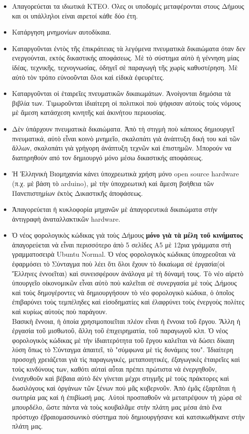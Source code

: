 \documentclass[a4paper]{article}
\begin{document}
\begin{itemize}
\item Aπαγορεύεται τα ιδιωτικά ΚΤΕΟ. Όλες οι υποδομές μεταφέρονται στους Δήμους και οι υπάλληλοι είναι αιρετοί κάθε δύο έτη.
\item Κατάργηση μνημονίων αυτοδίκαια.
\item Καταργοῦνται ἐντὸς τῆς ἐπικράτειας τὰ λεγόμενα πνευματικὰ δικαιώματα όταν δεν ενεργούνται, εκτός δικαστικής αποφάσεως. Μὲ τὸ σύστημα αὐτὸ ἡ γέννηση μίας ἰδέας, τεχνικῆς, τεχνογνωσίας, ὁδηγεῖ σὲ παραγωγὴ τῆς χωρὶς καθυστέρηση. Μὲ αὐτὸ τὸν τρόπο εὐνοοῦνται ὅλοι καὶ εἰδικὰ ἐφευρέτες.
\item Καταργοῦνται οἱ ἑταιρεῖες πνευματικῶν δικαιωμάτων. Ἀνοίγονται δημόσια τὰ βιβλία των. Τιμωροῦνται ἰδιαίτερη οἱ πολιτικοὶ ποὺ ψήφισαν αὐτοὺς τοὺς νόμους μὲ ἄμεση κατάσχεση κινητῆς καὶ ἀκινήτου περιουσίας.
\item Δὲν ὑπάρχουν πνευματικὰ δικαιώματα. Ἀπὸ τὴ στιγμὴ ποὺ κάποιος δημιουργεῖ πνευματικά, αὐτὸ εἶναι κοινὸ μνημεῖο, σκαλοπάτι γιὰ ἀνάπτυξη δική του καὶ τῶν ἄλλων, σκαλοπάτι γιὰ γρήγορη ἀνάπτυξη τεχνῶν καὶ ἐπιστημῶν. Μπορούν να διατηρηθούν από τον δημιουργό μόνο μέσω δικαστικής αποφάσεως.
\item  Ἡ Ἑλληνικὴ Βιομηχανία κάνει ὑποχρεωτικὰ χρήση μόνο open source hardware (π.χ. μὲ βάση τὸ arduino), μὲ τὴν ὑποχρεωτικὴ καὶ ἄμεση βοήθεια τῶν Πανεπιστημίων ἐκτὸς Δικαστικῆς ἀποφάσεως.
\item Ἀπαγορεύεται ἡ κυκλοφορία μηχανῶν μὲ ἀπαγορευτικά δικαιώματα στὴν ἀντιγραφὴ ἀναταλλακτικῶν hardware.
\item Ὁ νέος φορολογικὸς κώδικας γιὰ τοὺς Δήμους \textbf{μόνο γιὰ τὰ μέλη τοῦ κινήματος} ἀπαγορεύεται νὰ εἶναι περισσότερο ἀπὸ 5 σελίδες Α5 μὲ 12ρια γράμματα στὴ γραμματοσειρὰ Ubuntu Normal. Ὁ νέος φορολογικὸς κώδικας ὑποχρεοῦται νὰ ἐφαρμόσει τὸ Σύνταγμα ποὺ λέει ὅτι ὅλοι ἔχουν τὸ δικαίωμα σὲ ἐργασία(οἱ Ἕλληνες ἐννοεῖται) καὶ συνεισφέρουν ἀνάλογα μὲ τὴ δύναμή τους. Τὸ νέο αἱρετὸ ὑπουργεῖο οἰκονομικῶν εἶναι αὐτὸ ποὺ καλεῖται σὲ συνεργασία μὲ τοὺς Δήμους καὶ τοὺς δημογέροντες νὰ δημιουργήσουν τὸ νέο φορολογικὸ κώδικα, ὁ ὁποῖος ἐπιβαρύνει τοὺς τεμπέληδες καὶ εἰσοδηματίες καὶ ἐλαφρύνει τοὺς ἐνεργοὺς πολίτες καὶ κυρίως αὐτοὺς ποὺ παράγουν. \\ Βασικὴ ἔννοια, ἡ ὁποία χρησιμοποιεῖται πλέον εἶναι ἡ ἔννοια τοῦ ἔργου. Ἄλλη ἡ ἐργασία τοῦ μισθωτοῦ, ἄλλη τοῦ ἐπιχειρηματία, τοῦ παραγωγοῦ κλπ. Ὁ νέος φορολογικὸς κώδικας μὲ τὴν ἰδιαιτερότητα τοῦ ἔργου καλεῖται νὰ δώσει δίκαιη λύση ὅπως τὸ Σύνταγμα ἀπαιτεῖ, τὸ "σύμφωνα μὲ τὶς δυνάμεις του". Ἰδιαίτερη προσοχὴ χρειάζεται γιὰ τὶς παραγωγικές, μεταποιητικές, ἐξαγωγικὲς ἑταιρεῖες καὶ τοὺς κινδύνους των, καθότι αὐταὶ αὖται πρέπει πρώτιστα νὰ ἐνεργηθοῦν, ἐνισχυθοῦν καὶ βέβαια αὐτὸ δὲν γίνεται μέχρι στιγμῆς μὲ τοὺς πράκτορες καὶ δωσιλόγους καὶ ὀργάνων τῶν ξένων πού μᾶς κυβερνοῦν. Ἀπὸ ἐμᾶς ἐξαρτᾶται ἡ σωτηρία μας καὶ ἡ ἐπιβίωσή μας. Αὐτοὶ προσπαθοῦν νὰ μετατρέψουν τὴ χώρα σὲ μπουρδέλο, ὥστε πάντα νὰ τοὺς κουβαλᾶμε στὴν πλάτη μας μέσα ἀπὸ ἕνα πρόστυχο ἐβραιομασσωνικὸ σύστημα ποὺ δημιουργήσανε καὶ κατσικωθήκανε στὴν πλάτη μας.


\end{itemize}
\end{document}
